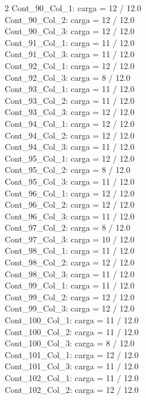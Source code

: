 \begin{multicols}{2}
Cont\_90\_Col\_1: carga = 12 / 12.0\\
Cont\_90\_Col\_2: carga = 12 / 12.0\\
Cont\_90\_Col\_3: carga = 12 / 12.0\\
Cont\_91\_Col\_1: carga = 11 / 12.0\\
Cont\_91\_Col\_3: carga = 11 / 12.0\\
Cont\_92\_Col\_1: carga = 12 / 12.0\\
Cont\_92\_Col\_3: carga = 8 / 12.0\\
Cont\_93\_Col\_1: carga = 11 / 12.0\\
Cont\_93\_Col\_2: carga = 11 / 12.0\\
Cont\_93\_Col\_3: carga = 12 / 12.0\\
Cont\_94\_Col\_1: carga = 12 / 12.0\\
Cont\_94\_Col\_2: carga = 12 / 12.0\\
Cont\_94\_Col\_3: carga = 11 / 12.0\\
Cont\_95\_Col\_1: carga = 12 / 12.0\\
Cont\_95\_Col\_2: carga = 8 / 12.0\\
Cont\_95\_Col\_3: carga = 11 / 12.0\\
Cont\_96\_Col\_1: carga = 12 / 12.0\\
Cont\_96\_Col\_2: carga = 12 / 12.0\\
Cont\_96\_Col\_3: carga = 11 / 12.0\\
Cont\_97\_Col\_2: carga = 8 / 12.0\\
Cont\_97\_Col\_3: carga = 10 / 12.0\\
Cont\_98\_Col\_1: carga = 11 / 12.0\\
Cont\_98\_Col\_2: carga = 12 / 12.0\\
Cont\_98\_Col\_3: carga = 11 / 12.0\\
Cont\_99\_Col\_1: carga = 11 / 12.0\\
Cont\_99\_Col\_2: carga = 12 / 12.0\\
Cont\_99\_Col\_3: carga = 12 / 12.0\\
Cont\_100\_Col\_1: carga = 11 / 12.0\\
Cont\_100\_Col\_2: carga = 11 / 12.0\\
Cont\_100\_Col\_3: carga = 8 / 12.0\\
Cont\_101\_Col\_1: carga = 12 / 12.0\\
Cont\_101\_Col\_3: carga = 11 / 12.0\\
Cont\_102\_Col\_1: carga = 11 / 12.0\\
Cont\_102\_Col\_2: carga = 12 / 12.0\\

\end{multicols}
